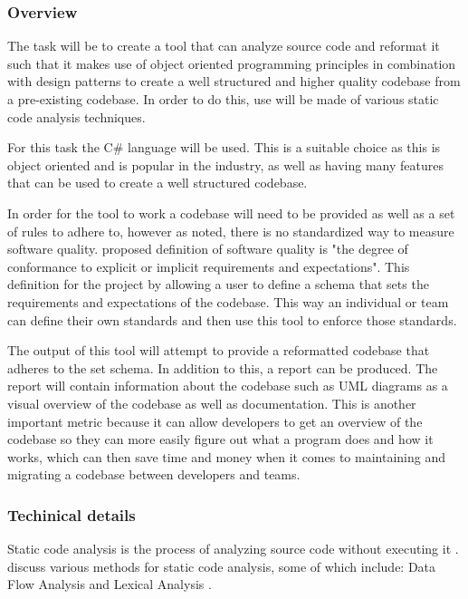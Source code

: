 
\subsubsection{Overview}
The task will be to create a tool that can analyze source code and reformat it such that it makes use of object oriented programming principles in combination with design patterns to create a well structured and higher quality codebase from a pre-existing codebase. In order to do this, use will be made of various static code analysis techniques.

For this task the C\# language will be used. This is a suitable choice as this is object oriented and is popular in the industry, as well as having many features that can be used to create a well structured codebase.

In order for the tool to work a codebase will need to be provided as well as a set of rules to adhere to, however as noted, there is no standardized way to measure software quality. \cite{8681007} proposed definition of software quality is "the degree of conformance to explicit or implicit requirements and expectations". This definition for the project by allowing a user to define a schema that sets the requirements and expectations of the codebase. This way an individual or team can define their own standards and then use this tool to enforce those standards.

The output of this tool will attempt to provide a reformatted codebase that adheres to the set schema. In addition to this, a report can be produced. The report will contain information about the codebase such as UML diagrams as a visual overview of the codebase as well as documentation. This is another important metric because it can allow developers to get an overview of the codebase so they can more easily figure out what a program does and how it works, which can then save time and money when it comes to maintaining and migrating a codebase between developers and teams.

\subsubsection{Techinical details}
Static code analysis is the process of analyzing source code without executing it \citep{8802820}. \cite{owasp/StaticCodeAnalysis} discuss various methods for static code analysis, some of which include: Data Flow Analysis \citep{owasp/StaticCodeAnalysis} and Lexical Analysis \citep{owasp/StaticCodeAnalysis}.

